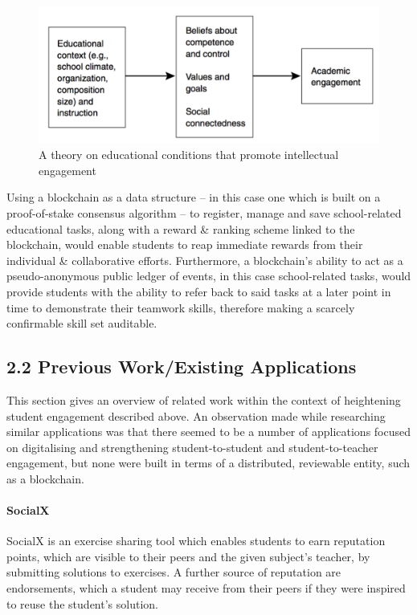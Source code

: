 \documentclass[12pt]{report}
\let\oldparagraph\paragraph
\renewcommand{\paragraph}[1]{\oldparagraph{#1}\mbox{}}
\begin{document}
\begin{figure}[htbp]
\centering
\includegraphics{../diagrams/educationalConditions.png}
\caption{A theory on educational conditions that promote intellectual
engagement}
\end{figure}

Using a blockchain as a data structure -- in this case one which is
built on a proof-of-stake consensus algorithm -- to register, manage and
save school-related educational tasks, along with a reward \& ranking
scheme linked to the blockchain, would enable students to reap immediate
rewards from their individual \& collaborative efforts. Furthermore, a
blockchain's ability to act as a pseudo-anonymous public ledger of
events, in this case school-related tasks, would provide students with
the ability to refer back to said tasks at a later point in time to
demonstrate their teamwork skills, therefore making a scarcely
confirmable skill set auditable.

\subsection{2.2 Previous Work/Existing
Applications}\label{previous-workexisting-applications}

This section gives an overview of related work within the context of
heightening student engagement described above. An observation made
while researching similar applications was that there seemed to be a
number of applications focused on digitalising and strengthening
student-to-student and student-to-teacher engagement, but none were
built in terms of a distributed, reviewable entity, such as a
blockchain.


\paragraph{SocialX}\label{socialx}

SocialX\cite{Temperini2008}\cite{Sterbini2009} is an exercise sharing tool which enables students to earn
reputation points, which are visible to their peers and the given
subject's teacher, by submitting solutions to exercises. A further
source of reputation are endorsements, which a student may receive from
their peers if they were inspired to reuse the student's solution.
\end{document}
